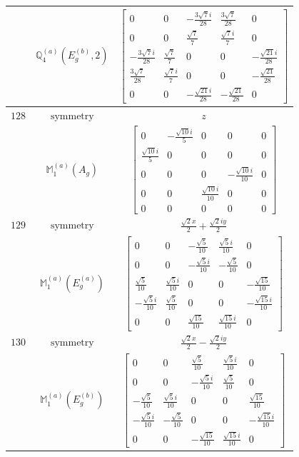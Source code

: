 \documentclass[fleqn,8pt,landscape]{jsarticle}
\begin{document}
\begin{longtable}{ccc}
$  $ & $ \mathbb{Q}_{4}^{(a)}(E_{g}^{(b)},2) $ & $ \begin{bmatrix} 0 & 0 & - \frac{3 \sqrt{7} i}{28} & \frac{3 \sqrt{7}}{28} & 0 \\ 0 & 0 & \frac{\sqrt{7}}{7} & \frac{\sqrt{7} i}{7} & 0 \\ - \frac{3 \sqrt{7} i}{28} & \frac{\sqrt{7}}{7} & 0 & 0 & - \frac{\sqrt{21} i}{28} \\ \frac{3 \sqrt{7}}{28} & \frac{\sqrt{7} i}{7} & 0 & 0 & - \frac{\sqrt{21}}{28} \\ 0 & 0 & - \frac{\sqrt{21} i}{28} & - \frac{\sqrt{21}}{28} & 0 \end{bmatrix} $ \\ \hline
$ 128 $ & $ \text{symmetry} $ & $ z $ \\
$  $ & $ \mathbb{M}_{1}^{(a)}(A_{g}) $ & $ \begin{bmatrix} 0 & - \frac{\sqrt{10} i}{5} & 0 & 0 & 0 \\ \frac{\sqrt{10} i}{5} & 0 & 0 & 0 & 0 \\ 0 & 0 & 0 & - \frac{\sqrt{10} i}{10} & 0 \\ 0 & 0 & \frac{\sqrt{10} i}{10} & 0 & 0 \\ 0 & 0 & 0 & 0 & 0 \end{bmatrix} $ \\ \hline
$ 129 $ & $ \text{symmetry} $ & $ \frac{\sqrt{2} x}{2} + \frac{\sqrt{2} i y}{2} $ \\
$  $ & $ \mathbb{M}_{1}^{(a)}(E_{g}^{(a)}) $ & $ \begin{bmatrix} 0 & 0 & - \frac{\sqrt{5}}{10} & \frac{\sqrt{5} i}{10} & 0 \\ 0 & 0 & - \frac{\sqrt{5} i}{10} & - \frac{\sqrt{5}}{10} & 0 \\ \frac{\sqrt{5}}{10} & \frac{\sqrt{5} i}{10} & 0 & 0 & - \frac{\sqrt{15}}{10} \\ - \frac{\sqrt{5} i}{10} & \frac{\sqrt{5}}{10} & 0 & 0 & - \frac{\sqrt{15} i}{10} \\ 0 & 0 & \frac{\sqrt{15}}{10} & \frac{\sqrt{15} i}{10} & 0 \end{bmatrix} $ \\ \hline
$ 130 $ & $ \text{symmetry} $ & $ \frac{\sqrt{2} x}{2} - \frac{\sqrt{2} i y}{2} $ \\
$  $ & $ \mathbb{M}_{1}^{(a)}(E_{g}^{(b)}) $ & $ \begin{bmatrix} 0 & 0 & \frac{\sqrt{5}}{10} & \frac{\sqrt{5} i}{10} & 0 \\ 0 & 0 & - \frac{\sqrt{5} i}{10} & \frac{\sqrt{5}}{10} & 0 \\ - \frac{\sqrt{5}}{10} & \frac{\sqrt{5} i}{10} & 0 & 0 & \frac{\sqrt{15}}{10} \\ - \frac{\sqrt{5} i}{10} & - \frac{\sqrt{5}}{10} & 0 & 0 & - \frac{\sqrt{15} i}{10} \\ 0 & 0 & - \frac{\sqrt{15}}{10} & \frac{\sqrt{15} i}{10} & 0 \end{bmatrix} $ \\ \hline

\end{longtable}
\end{document}
